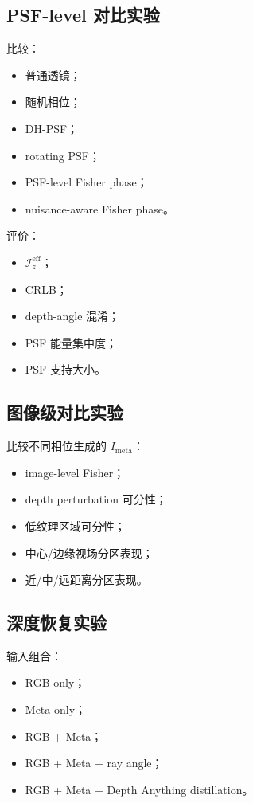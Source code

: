 \documentclass[11pt,a4paper,fontset=none]{ctexart}
\begin{document}
\subsection{PSF-level 对比实验}

比较：
\begin{itemize}
  \item 普通透镜；
  \item 随机相位；
  \item DH-PSF；
  \item rotating PSF；
  \item PSF-level Fisher phase；
  \item nuisance-aware Fisher phase。
\end{itemize}

评价：
\begin{itemize}
  \item $\mathcal I_z^{\mathrm{eff}}$；
  \item CRLB；
  \item depth-angle 混淆；
  \item PSF 能量集中度；
  \item PSF 支持大小。
\end{itemize}

\subsection{图像级对比实验}

比较不同相位生成的 $I_{\mathrm{meta}}$：
\begin{itemize}
  \item image-level Fisher；
  \item depth perturbation 可分性；
  \item 低纹理区域可分性；
  \item 中心/边缘视场分区表现；
  \item 近/中/远距离分区表现。
\end{itemize}

\subsection{深度恢复实验}

输入组合：
\begin{itemize}
  \item RGB-only；
  \item Meta-only；
  \item RGB + Meta；
  \item RGB + Meta + ray angle；
  \item RGB + Meta + Depth Anything distillation。
\end{itemize}
\end{document}
